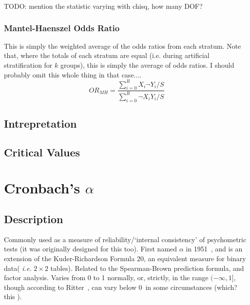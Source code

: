 \documentclass[11pt]{article}
\begin{document}
TODO: mention the statistic varying with chisq, how many DOF?

\subsubsection{Mantel-Haenszel Odds Ratio}
This is simply the weighted average of the odds ratios from each stratum.  Note that, where the totals of each stratum are equal (i.e. during artificial stratification for $k$ groups), this is simply the average of odds ratios.  {\color{red} I should probably omit this whole thing in that case...}.
$$
OR_{MH} = \frac{ { \sum_{i=0}^{R}{ X_i ¬Y_i } / S } }{ { \sum_{i=0}^{R}{ ¬X_i Y_i } / S} }
$$

\subsection{Intrepretation}

\subsection{Critical Values}















\section{Cronbach's $\alpha$}
\label{section:cronbachalpha}
\subsection{Description}
Commonly used as a measure of reliability/`internal consistency' of psychometric tests \cite{schmitt1996uses} (it was originally designed for this too).  
First named $\alpha$ in 1951~\cite{cronbach1951coefficient}, and is an extension of the Kuder-Richardson Formula 20, an equivalent measure for binary data( \textsl{i.e.} $2\times 2$ tables).
Related to the Spearman-Brown prediction formula, and factor analysis.  
Varies from 0 to 1 normally, or, strictly, in the range $(-\infty, 1]$, though according to Ritter~\cite{ritter2010understanding}, can vary below 0~in some circumstances {\color{red} (which? this \cite{cronbachalphanegative} )}. \cite{bland1997statistics}
\end{document}
